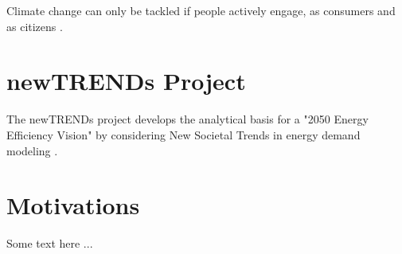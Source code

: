 Climate change can only be tackled 
if people actively engage, 
as consumers and as citizens \cite{clean}. 

\section{newTRENDs Project}

The newTRENDs project 
develops the analytical basis 
for a "2050 Energy Efficiency Vision" 
by considering New Societal Trends in energy demand modeling \cite{newtrends}.

\section{Motivations}

Some text here ...

